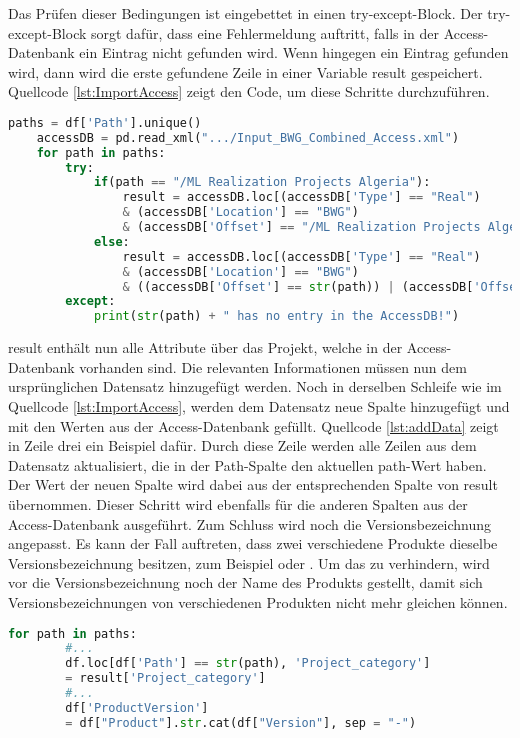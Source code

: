 Das Prüfen dieser Bedingungen ist eingebettet in einen try-except-Block. Der try-except-Block sorgt dafür, dass eine Fehlermeldung auftritt, falls in der Access-Datenbank ein Eintrag nicht gefunden wird.
Wenn hingegen ein Eintrag gefunden wird, dann wird die erste gefundene Zeile in einer Variable \glqq result\grqq{} gespeichert. Quellcode \ref*{lst:ImportAccess} zeigt den Code, um diese Schritte durchzuführen.
\begin{lstlisting}[language = python, caption={Importieren der Access-Datenbank},captionpos=b, label = lst:ImportAccess, float, floatplacement=H]
    paths = df['Path'].unique()
    accessDB = pd.read_xml(".../Input_BWG_Combined_Access.xml")
    for path in paths:
        try:
            if(path == "/ML Realization Projects Algeria"):
                result = accessDB.loc[(accessDB['Type'] == "Real") 
                & (accessDB['Location'] == "BWG") 
                & (accessDB['Offset'] == "/ML Realization Projects Algeria/20006_ML_BM_Boughezoul_MSila")].iloc[0]
            else:
                result = accessDB.loc[(accessDB['Type'] == "Real") 
                & (accessDB['Location'] == "BWG") 
                & ((accessDB['Offset'] == str(path)) | (accessDB['Offset'] == (str(path) + "/")))].iloc[0]           
        except:
            print(str(path) + " has no entry in the AccessDB!")
\end{lstlisting}
\glqq result\grqq{} enthält nun alle Attribute über das Projekt, welche in der Access-Datenbank vorhanden sind. Die relevanten Informationen müssen nun dem ursprünglichen 
Datensatz hinzugefügt werden. Noch in derselben Schleife wie im Quellcode \ref*{lst:ImportAccess}, werden dem Datensatz neue Spalte hinzugefügt und mit den Werten aus der 
Access-Datenbank gefüllt. Quellcode \ref*{lst:addData} zeigt in Zeile drei ein Beispiel dafür. Durch diese Zeile werden alle Zeilen aus dem Datensatz aktualisiert, 
die in der \glqq Path\grqq{}-Spalte den aktuellen \glqq path\grqq{}-Wert haben. Der Wert der neuen Spalte wird dabei aus der entsprechenden Spalte von \glqq result\grqq{} übernommen.
Dieser Schritt wird ebenfalls für die anderen Spalten aus der Access-Datenbank ausgeführt. Zum Schluss wird noch die Versionsbezeichnung angepasst. 
Es kann der Fall auftreten, dass zwei verschiedene Produkte dieselbe Versionsbezeichnung besitzen, zum Beispiel \grqq{} oder \grqq{}. Um das zu verhindern,
wird vor die Versionsbezeichnung noch der Name des Produkts gestellt, damit sich Versionsbezeichnungen von verschiedenen Produkten nicht mehr gleichen können.
\begin{lstlisting}[language = python, caption={Erweiterung des Datensatzes},captionpos=b, label = lst:addData, floatplacement=H]
    for path in paths:
        #...
        df.loc[df['Path'] == str(path), 'Project_category']
        = result['Project_category']
        #...
        df['ProductVersion'] 
        = df["Product"].str.cat(df["Version"], sep = "-")
\end{lstlisting}
